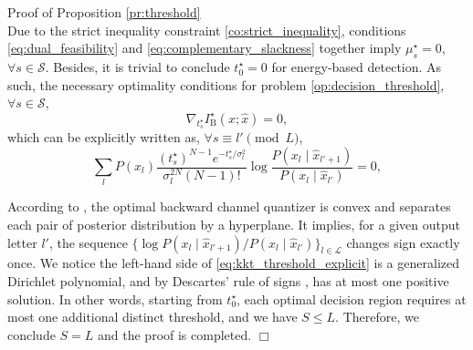 \documentclass[journal]{IEEEtran}
\renewcommand{\qedsymbol}{\hfill\ensuremath{\Box}}
\begin{document}
\begin{appendix}
\begin{subsection}{Proof of Proposition \ref{pr:threshold}}
\begin{subequations}
		\end{subequations}
		Due to the strict inequality constraint \eqref{co:strict_inequality}, conditions \eqref{eq:dual_feasibility} and \eqref{eq:complementary_slackness} together imply $\mu_s^\star = 0$, $\forall s \in \mathcal{S}$.
		Besides, it is trivial to conclude $t_0^\star = 0$ for energy-based detection.
		As such, the necessary optimality conditions for problem \eqref{op:decision_threshold}, $\forall s \in \mathcal{S}$,
		\begin{equation}
			\nabla_{t_{s}^\star} I^\star_{\mathrm{B}}(x;\hat{x}) = 0,
		\end{equation}
		which can be explicitly written as, $\forall s \equiv l' \pmod L$,
		\begin{equation}
			\sum_l P(x_l) \frac{(t_s^\star)^{N-1} e^{-t_s^\star/\sigma_l^2}}{\sigma_l^{2N} (N-1)!} \log \frac{P(x_l \mid \hat{x}_{l'+1})}{P(x_l \mid \hat{x}_{l'})} = 0,
			\label{eq:kkt_threshold_explicit}
		\end{equation}

		According to \cite{He2021}, the optimal backward channel quantizer is convex and separates each pair of posterior distribution by a hyperplane.
		It implies, for a given output letter $l'$, the sequence $\{\log {P(x_l \mid \hat{x}_{l'+1})}/{P(x_l \mid \hat{x}_{l'})}\}_{l \in \mathcal{L}}$ changes sign exactly once.
		We notice the left-hand side of \eqref{eq:kkt_threshold_explicit} is a generalized Dirichlet polynomial, and by Descartes' rule of signs \cite{Jameson2006}, has at most one positive solution.
		In other words, starting from $t_0^\star$, each optimal decision region requires at most one additional distinct threshold, and we have $S \le L$.
		Therefore, we conclude $S = L$ and the proof is completed.
		\qedsymbol
		\label{ap:threshold}
	\end{subsection}
\end{appendix}




\end{document}
